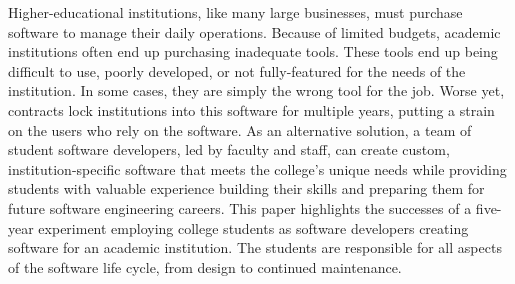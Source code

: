Higher-educational institutions, like many large businesses, must purchase software to manage their daily operations. Because of limited budgets, academic institutions often end up purchasing inadequate tools. These tools end up being difficult to use, poorly developed, or not fully-featured for the needs of the institution. In some cases, they are simply the wrong tool for the job. Worse yet, contracts lock institutions into this software for multiple years, putting a strain on the users who rely on the software. As an alternative solution, a team of student software developers, led by faculty and staff, can create custom, institution-specific software that meets the college's unique needs while providing students with valuable experience building their skills and preparing them for future software engineering careers. This paper highlights the successes of a five-year experiment employing college students as software developers creating software for an academic institution. The students are responsible for all aspects of the software life cycle, from design to continued maintenance.